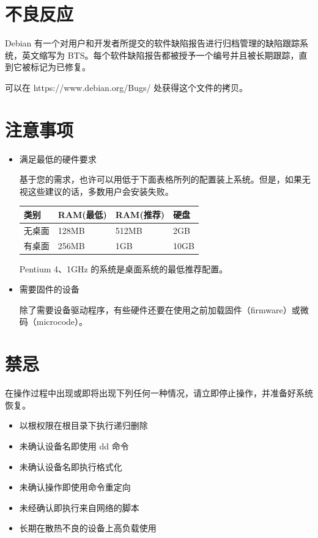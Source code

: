 \documentclass{article}
\begin{document}
\begin{multicols*}{3}
	\section*{不良反应}

	Debian 有一个对用户和开发者所提交的软件缺陷报告进行归档管理的缺陷跟踪系统，英文缩写为 BTS。每个软件缺陷报告都被授予一个编号并且被长期跟踪，直到它被标记为已修复。
	
	可以在 https://www.debian.org/Bugs/ 处获得这个文件的拷贝。


	\section*{注意事项}
	\begin{itemize}[leftmargin=*]

		\item 满足最低的硬件要求
		
		基于您的需求，也许可以用低于下面表格所列的配置装上系统。但是，如果无视这些建议的话，多数用户会安装失败。

		{\small\begin{tabularx}{\linewidth}{|X|X|X|X|}
			\hline
			类别 & RAM\newline (最低) & RAM\newline (推荐) & 硬盘 \\
			\hline
			无桌面 & 128MB & 512MB & 2GB \\
			\hline
			有桌面 & 256MB & 1GB & 10GB \\
			\hline
		\end{tabularx}}

		Pentium 4、1GHz 的系统是桌面系统的最低推荐配置。

		\item 需要固件的设备
		
		除了需要设备驱动程序，有些硬件还要在使用之前加载固件（firmware）或微码（microcode）。

	\end{itemize}


	\section*{禁忌}

	在操作过程中出现或即将出现下列任何一种情况，请立即停止操作，并准备好系统恢复。

	\begin{itemize}[leftmargin=*]
		\setlength{\itemsep}{0pt}
		\setlength{\parskip}{0pt}
		\setlength{\parsep}{0pt}

		\item 以根权限在根目录下执行递归删除
		\item 未确认设备名即使用 dd 命令
		\item 未确认设备名即执行格式化
		\item 未确认操作即使用命令重定向
		\item 未经确认即执行来自网络的脚本
		\item 长期在散热不良的设备上高负载使用
	\end{itemize}



\end{multicols*}
\end{document}
